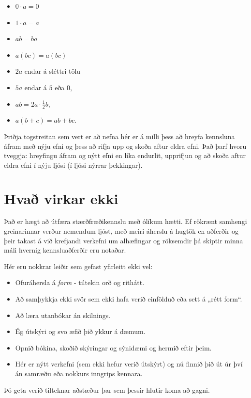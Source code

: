 \documentclass[
  icelandic,
]{book}
\providecommand{\tightlist}{%
  \setlength{\itemsep}{0pt}\setlength{\parskip}{0pt}}
\theoremstyle{definition}
\theoremstyle{definition}
\theoremstyle{definition}
\theoremstyle{definition}
\theoremstyle{remark}
\begin{document}
\begin{itemize}
\tightlist
\item
  \(0 \cdot a = 0\)
\item
  \(1 \cdot a = a\)
\item
  \(ab = ba\)
\item
  \(a(bc)=a(bc)\)
\item
  \(2a\) endar á sléttri tölu
\item
  \(5a\) endar á \(5\) eða \(0\),
\item
  \(ab = 2a \cdot \frac{1}{2}b\),
\item
  \(a(b+c) = ab + bc\).
\end{itemize}

Þriðja togstreitan sem vert er að nefna hér er á milli þess að hreyfa kennsluna áfram með nýju efni og þess að rifja upp og skoða aftur eldra efni. Það þarf hvoru tveggja: hreyfingu áfram og nýtt efni en líka endurlit, upprifjun og að skoða aftur eldra efni í nýju ljósi (í ljósi nýrrar þekkingar).

\section{Hvað virkar ekki}\label{virkar-ekki}

Það er hægt að útfæra stærðfræðikennslu með ólíkum hætti. Ef rökrænt samhengi greinarinnar verður nemendum ljóst, með meiri áherslu á hugtök en aðferðir og þeir takast á við krefjandi verkefni um alhæfingar og röksemdir þá skiptir minna máli hvernig kennsluaðferðir eru notaðar.

Hér eru nokkrar leiðir sem gefast yfirleitt ekki vel:

\begin{itemize}
\tightlist
\item
  Ofuráhersla á \emph{form} - tiltekin orð og rithátt.
\item
  Að samþykkja ekki svör sem ekki hafa verið einfölduð eða sett á „rétt form``.
\item
  Að læra utanbókar án skilnings.
\item
  Ég útskýri og svo æfið þið ykkur á dæmum.
\item
  Opnið bókina, skoðið skýringar og sýnidæmi og hermið eftir þeim.
\item
  Hér er nýtt verkefni (sem ekki hefur verið útskýrt) og nú finnið þið út úr því án samræðu eða nokkurs inngrips kennara.
\end{itemize}

Þó geta verið tilteknar aðstæður þar sem þessir hlutir koma að gagni.
\end{document}
